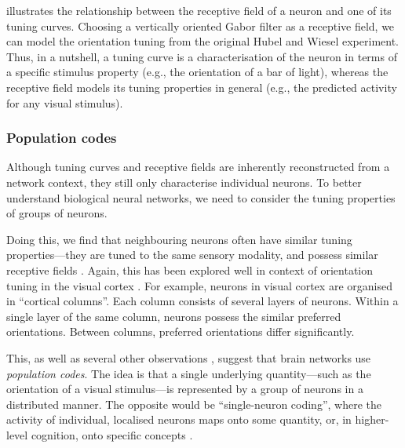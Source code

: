 illustrates the relationship between the receptive field of a neuron and one of its tuning curves.
Choosing a vertically oriented Gabor filter as a receptive field, we can model the orientation tuning from the original Hubel and Wiesel experiment.
Thus, in a nutshell, a tuning curve is a characterisation of the neuron in terms of a specific stimulus property (e.g., the orientation of a bar of light), whereas the receptive field models its tuning properties in general (e.g., the predicted activity for any visual stimulus).

\subsubsection{Population codes}
Although tuning curves and receptive fields are inherently reconstructed from a network context, they still only characterise individual neurons.
To better understand biological neural networks, we need to consider the tuning properties of groups of neurons.

Doing this, we find that neighbouring neurons often have similar tuning properties---they are tuned to the same sensory modality, and possess similar receptive fields \citep{berkowitz2009population}.
Again, this has been explored well in context of orientation tuning in the visual cortex \citep[Chapter~25]{kandel2012principles}.
For example, neurons in visual cortex are organised in \enquote{cortical columns}.
Each column consists of several layers of neurons.
Within a single layer of the same column, neurons possess the similar preferred orientations.
Between columns, preferred orientations differ significantly.

This, as well as several other observations \citep{yuste2015neuron}, suggest that brain networks use \emph{population codes}.
The idea is that a single underlying quantity---such as the orientation of a visual stimulus---is represented by a group of neurons in a distributed manner.
The opposite would be \enquote{single-neuron coding}, where the activity of individual, localised neurons maps onto some quantity, or, in higher-level cognition, onto specific concepts \citep{berkowitz2009population}.

